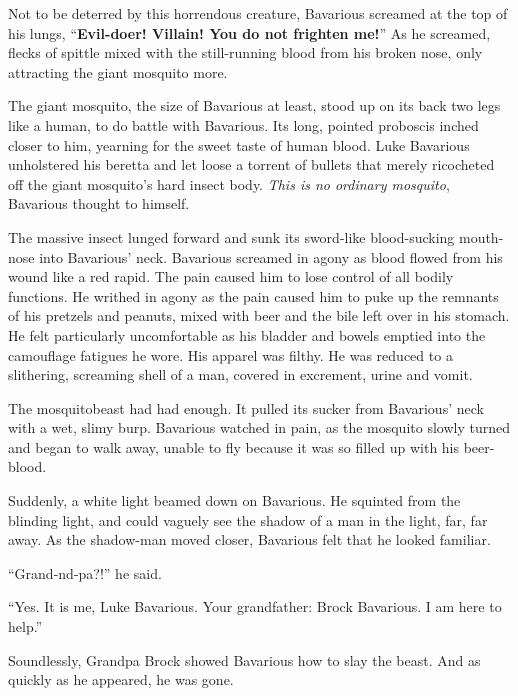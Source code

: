 Not to be deterred by this horrendous creature, Bavarious screamed at the
top of his lungs, ``{\bf Evil-doer! Villain! You do not frighten
me!}'' As he screamed, flecks of spittle mixed with the
still-running blood from his broken nose, only attracting the giant
mosquito more.



The giant mosquito, the size of Bavarious at least, stood up on its
back two legs like a human, to do battle with Bavarious. Its long,
pointed proboscis inched closer to him, yearning for the sweet
taste of human blood. Luke Bavarious unholstered his beretta and
let loose a torrent of bullets that merely ricocheted off the giant
mosquito's hard insect body. {\em This is no ordinary
mosquito}, Bavarious thought to himself.



The massive insect lunged forward and sunk its sword-like
blood-sucking mouth-nose into Bavarious' neck. Bavarious
screamed in agony as blood flowed from his wound like a red rapid.
The pain caused him to lose control of all bodily functions. He
writhed in agony as the pain caused him to puke up the remnants of
his pretzels and peanuts, mixed with beer and the bile left over in
his stomach. He felt particularly uncomfortable as his bladder and
bowels emptied into the camouflage fatigues he wore. His apparel
was filthy. He was reduced to a slithering, screaming shell of a
man, covered in excrement, urine and vomit.



The mosquitobeast had had enough. It pulled its sucker from
Bavarious' neck with a wet, slimy burp. Bavarious watched in
pain, as the mosquito slowly turned and began to walk away, unable
to fly because it was so filled up with his beer-blood.



Suddenly, a white light beamed down on Bavarious. He squinted from
the blinding light, and could vaguely see the shadow of a man in
the light, far, far away. As the shadow-man moved closer, Bavarious
felt that he looked familiar.



``Grand-nd-pa?!'' he said.



``Yes. It is me, Luke Bavarious. Your grandfather: Brock
Bavarious. I am here to help.''



Soundlessly, Grandpa Brock showed Bavarious how to slay the beast.
And as quickly as he appeared, he was gone.



